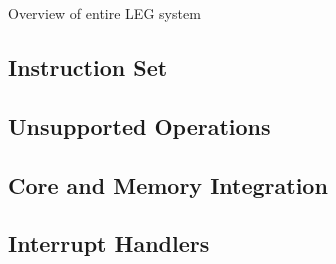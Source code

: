 Overview of entire LEG system

\subsection{Instruction Set}

\subsection{Unsupported Operations}

\subsection{Core and Memory Integration}

\subsection{Interrupt Handlers}